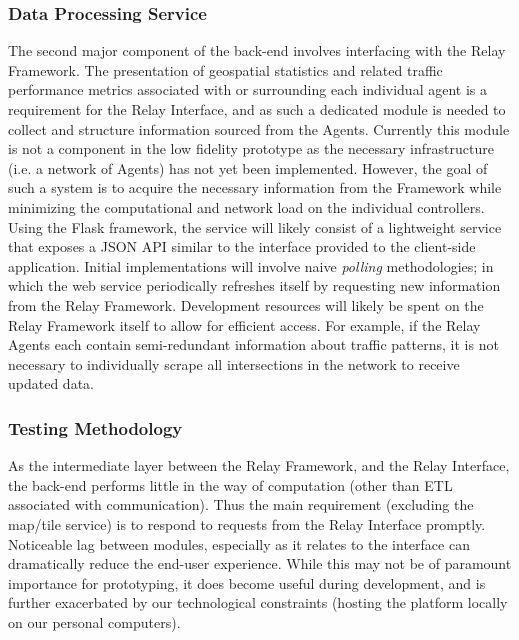 \documentclass{article}
\begin{document}
\subsubsection{Data Processing Service}

The second major component of the back-end involves interfacing with the Relay Framework.
The presentation of geospatial statistics and related traffic performance metrics associated with or surrounding each individual agent is a requirement for the Relay Interface, and as such a dedicated module is needed to collect and structure information sourced from the Agents.
Currently this module is not a component in the low fidelity prototype as the necessary infrastructure (i.e. a network of Agents) has not yet been implemented.
However, the goal of such a system is to acquire the necessary information from the Framework while minimizing the computational and network load on the individual controllers.
Using the Flask framework, the service will likely consist of a lightweight service that exposes a JSON API similar to the interface provided to the client-side application.
Initial implementations will involve naive \emph{polling} methodologies; in which the web service periodically refreshes itself by requesting new information from the Relay Framework.
Development resources will likely be spent on the Relay Framework itself to allow for efficient access.
For example, if the Relay Agents each contain semi-redundant information about traffic patterns, it is not necessary to individually scrape all intersections in the network to receive updated data.\\

\subsubsection{Testing Methodology}

As the intermediate layer between the Relay Framework, and the Relay Interface, the back-end performs little in the way of computation (other than ETL associated with communication).
Thus the main requirement (excluding the map/tile service) is to respond to requests from the Relay Interface promptly.
Noticeable lag between modules, especially as it relates to the interface can dramatically reduce the end-user experience.
While this may not be of paramount importance for prototyping, it does become useful during development, and is further exacerbated by our technological constraints (hosting the platform locally on our personal computers).\\
\end{document}
